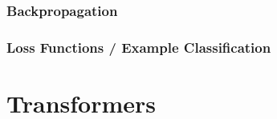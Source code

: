 %
%
%
%
%
%
%
%
%

%
%
%
%

%

\subsubsection{Backpropagation}

\subsubsection{Loss Functions / Example Classification}

\section{Transformers}\label{sec:trans}


